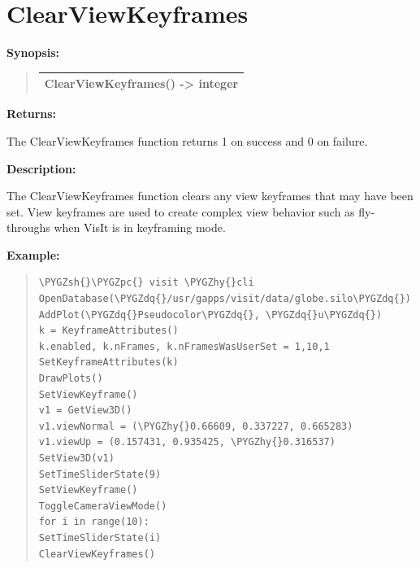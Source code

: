 \documentclass[letterpaper,10pt,english]{sphinxmanual}
\def\PYGZsh{\char`\#}
\def\PYGZpc{\char`\%}
\def\PYGZhy{\char`\-}
\def\PYGZdq{\char`\"}
\begin{document}
\section{ClearViewKeyframes}
\label{functions:clearviewkeyframes}
\begin{DUlineblock}{0em}
\item[] \textbf{Synopsis:}
\end{DUlineblock}
\begin{quote}

\begin{tabulary}{\linewidth}{|L|}
\hline

ClearViewKeyframes() -\textgreater{} integer
\\
\hline\end{tabulary}

\end{quote}

\begin{DUlineblock}{0em}
\item[] 
\item[] \textbf{Returns:}
\item[] The ClearViewKeyframes function returns 1 on success and 0 on failure.
\item[] 
\item[] \textbf{Description:}
\item[] The ClearViewKeyframes function clears any view keyframes that may have
been set. View keyframes are used to create complex view behavior such as
fly-throughs when VisIt is in keyframing mode.
\end{DUlineblock}

\begin{DUlineblock}{0em}
\item[] 
\end{DUlineblock}

\begin{DUlineblock}{0em}
\item[] \textbf{Example:}
\item[] 
\end{DUlineblock}
\begin{quote}

\begin{Verbatim}[commandchars=\\\{\}]
\PYGZsh{}\PYGZpc{} visit \PYGZhy{}cli
OpenDatabase(\PYGZdq{}/usr/gapps/visit/data/globe.silo\PYGZdq{})
AddPlot(\PYGZdq{}Pseudocolor\PYGZdq{}, \PYGZdq{}u\PYGZdq{})
k = KeyframeAttributes()
k.enabled, k.nFrames, k.nFramesWasUserSet = 1,10,1
SetKeyframeAttributes(k)
DrawPlots()
SetViewKeyframe()
v1 = GetView3D()
v1.viewNormal = (\PYGZhy{}0.66609, 0.337227, 0.665283)
v1.viewUp = (0.157431, 0.935425, \PYGZhy{}0.316537)
SetView3D(v1)
SetTimeSliderState(9)
SetViewKeyframe()
ToggleCameraViewMode()
for i in range(10):
SetTimeSliderState(i)
ClearViewKeyframes()
\end{Verbatim}
\end{quote}
\end{document}
